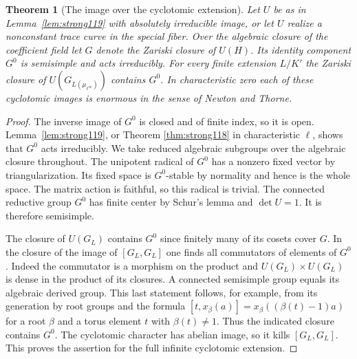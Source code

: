 \documentclass[a4paper,11pt]{article}
\newtheorem{theorem}[proposition]{Theorem}
\theoremstyle{definition}
\theoremstyle{remark}
\numberwithin{equation}{section}
\begin{document}
\begin{theorem}[The image over the cyclotomic extension]
\label{thm:cyclo119}
Let \(U\) be as in Lemma~\ref{lem:strong119} with absolutely
irreducible image, or let \(U\) realize a nonconstant trace
curve in the special fiber. Over the algebraic closure of the
coefficient field let \(G\) denote the Zariski closure of
\(U(H)\). Its identity component \(G^0\) is semisimple and acts
irreducibly. For every finite extension \(L/K'\) the Zariski
closure of \(U(G_{L(\mu_{\ell^\infty})})\) contains \(G^0\).
In characteristic zero each of these cyclotomic images is
enormous in the sense of Newton and Thorne.
\end{theorem}
\begin{proof}
The inverse image of \(G^0\) is closed and of finite index, so
it is open. Lemma~\ref{lem:strong119}, or Theorem \ref{thm:strong118} in characteristic \(\ell\), shows that \(G^0\)
acts irreducibly. We take reduced algebraic subgroups over the
algebraic closure throughout. The unipotent radical of \(G^0\)
has a nonzero fixed vector by triangularization. Its fixed
space is \(G^0\)-stable by normality and hence is the whole
space. The matrix action is faithful, so this radical is
trivial. The connected reductive group \(G^0\) has finite
center by Schur's lemma and \(\det U=1\). It is therefore
semisimple.

The closure of \(U(G_L)\) contains \(G^0\) since finitely
many of its cosets cover \(G\). In the closure of the image of
\([G_L,G_L]\) one finds all commutators of elements of \(G^0\).
Indeed the commutator is a morphism on the product and
\(U(G_L)\times U(G_L)\) is dense in the product of its
closures. A connected semisimple group equals its algebraic
derived group. This last statement follows, for example,
from its generation by root groups and the formula
\([t,x_\beta(a)]=x_\beta((\beta(t)-1)a)\) for a root
\(\beta\) and a torus element \(t\) with \(\beta(t)\ne1\).
Thus the indicated closure contains \(G^0\). The cyclotomic
character has abelian image, so it kills \([G_L,G_L]\). This
proves the assertion for the full infinite cyclotomic extension.


\end{proof}
\end{document}
